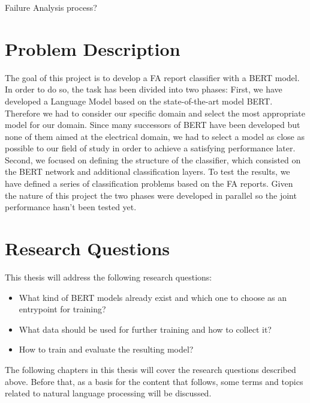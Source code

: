 \alert{Failure Analysis process?}

\section{Problem Description}
The goal of this project is to develop a FA report classifier with a BERT model.
In order to do so, the task has been divided into two phases: \newline
First, we have developed a Language Model based on the state-of-the-art model BERT. Therefore we had to consider our specific domain and select the most appropriate model for our domain. Since many successors of BERT have been developed but none of them aimed at the electrical domain, we had to select a model as close as possible to our field of study in order to achieve a satisfying performance later. \newline
Second, we focused on defining the structure of the classifier, which consisted on the BERT network and additional classification layers. To test the results, we have defined a series of classification problems based on the FA reports. \newline
Given the nature of this project the two phases were developed in parallel so the joint performance hasn't been tested yet. \newline

\section{Research Questions}
This thesis will address the following research questions:
\begin{itemize}
	\item What kind of BERT models already exist and which one to choose as an entrypoint for training?
	\item What data should be used for further training and how to collect it?
	\item How to train and evaluate the resulting model?
\end{itemize}

The following chapters in this thesis will cover the research questions described above. Before that, as a basis for the content that follows, some terms and topics related to natural language processing will be discussed.

